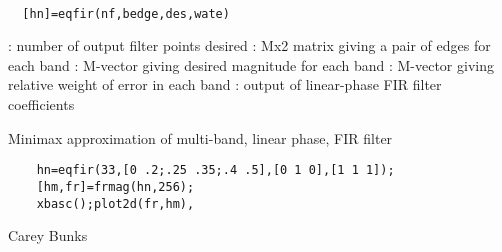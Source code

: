 
\begin{mandesc}
   \\ %
\end{mandesc}
\begin{calling_sequence}
\begin{verbatim}
  [hn]=eqfir(nf,bedge,des,wate)  
\end{verbatim}
\end{calling_sequence}
\begin{parameters}
  \begin{varlist}
    : number of output filter points desired
    : Mx2 matrix giving a pair of edges for each band
    : M-vector giving desired magnitude for each band
    : M-vector giving relative weight of error in each band
    : output of linear-phase FIR filter coefficients
  \end{varlist}
\end{parameters}
\begin{mandescription}
  Minimax approximation of multi-band, linear phase, FIR filter
\end{mandescription}
\begin{examples}
  \begin{Verbatim}
    hn=eqfir(33,[0 .2;.25 .35;.4 .5],[0 1 0],[1 1 1]);
    [hm,fr]=frmag(hn,256);
    xbasc();plot2d(fr,hm),
  \end{Verbatim}
\end{examples}
\begin{authors}
    Carey Bunks  
\end{authors}
